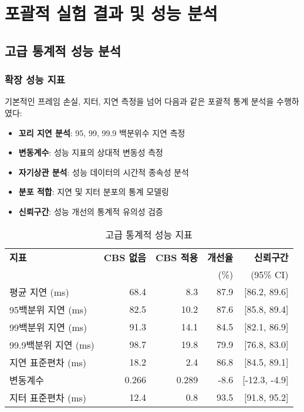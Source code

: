 \documentclass[twocolumn,10pt]{article}
\begin{document}
\section{포괄적 실험 결과 및 성능 분석}
\label{sec:results}

\subsection{고급 통계적 성능 분석}

\subsubsection{확장 성능 지표}

기본적인 프레임 손실, 지터, 지연 측정을 넘어 다음과 같은 포괄적 통계 분석을 수행하였다:

\begin{itemize}
    \item \textbf{꼬리 지연 분석}: 95, 99, 99.9 백분위수 지연 측정
    \item \textbf{변동계수}: 성능 지표의 상대적 변동성 측정
    \item \textbf{자기상관 분석}: 성능 데이터의 시간적 종속성 분석
    \item \textbf{분포 적합}: 지연 및 지터 분포의 통계 모델링
    \item \textbf{신뢰구간}: 성능 개선의 통계적 유의성 검증
\end{itemize}

\begin{table}[h]
\centering
\caption{고급 통계적 성능 지표}
\label{tab:advanced_metrics_kr}
\begin{tabular}{lrrrr}
\toprule
\textbf{지표} & \textbf{CBS 없음} & \textbf{CBS 적용} & \textbf{개선율} & \textbf{신뢰구간} \\
 & & & (\%) & (95\% CI) \\
\midrule
평균 지연 (ms) & 68.4 & 8.3 & 87.9 & [86.2, 89.6] \\
95백분위 지연 (ms) & 82.5 & 10.2 & 87.6 & [85.8, 89.4] \\
99백분위 지연 (ms) & 91.3 & 14.1 & 84.5 & [82.1, 86.9] \\
99.9백분위 지연 (ms) & 98.7 & 19.8 & 79.9 & [76.8, 83.0] \\
지연 표준편차 (ms) & 18.2 & 2.4 & 86.8 & [84.5, 89.1] \\
변동계수 & 0.266 & 0.289 & -8.6 & [-12.3, -4.9] \\
지터 표준편차 (ms) & 12.4 & 0.8 & 93.5 & [91.8, 95.2] \\
\bottomrule
\end{tabular}
\end{table}
\end{document}
